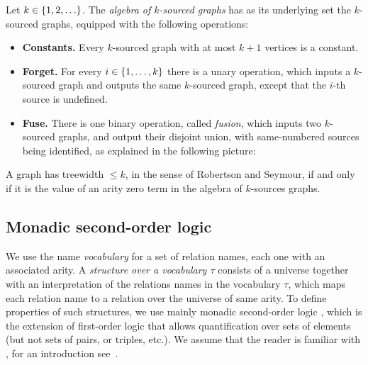     
    \begin{definition}
         Let $k \in \{1,2,\ldots\}$. The \emph{algebra of $k$-sourced graphs} has as its underlying set the  $k$-sourced graphs, equipped with the following operations:
            \begin{itemize}
                \item {\bf Constants.} Every $k$-sourced graph with at most $k+1$ vertices is a constant.
                \item {\bf Forget.} For every $i \in \{1,\ldots,k\}$ there is a unary operation, which inputs a $k$-sourced graph and outputs the same $k$-sourced graph, except that the $i$-th source is undefined. 
                \item {\bf Fuse.} There is one binary operation, called \emph{fusion}, which inputs two $k$-sourced graphs, and output their disjoint union, with same-numbered sources being identified, as explained in the following picture:
            \end{itemize}
        \end{definition}
    
  

    \begin{lemma}
        A graph has treewidth $\le k$, in the sense of Robertson and Seymour,  if and only if it is the value of an arity zero term in the algebra of $k$-sources graphs.
    \end{lemma}


    \subsection{Monadic second-order logic}
     We use the name  \emph{vocabulary} for a set of relation names, each one with an associated arity. A \emph{structure over a vocabulary $\tau$} consists of a universe together with an interpretation of the relations names in the vocabulary $\tau$, which maps each relation name to a relation over the universe of same arity. To define properties of such structures, we use mainly monadic second-order logic \mso, which  is the extension of first-order logic that allows quantification over sets of elements (but not sets of pairs, or triples, etc.). We assume that the reader is familiar with \mso, for an introduction see~\cite[Section 2]{Thomas97}.
     
